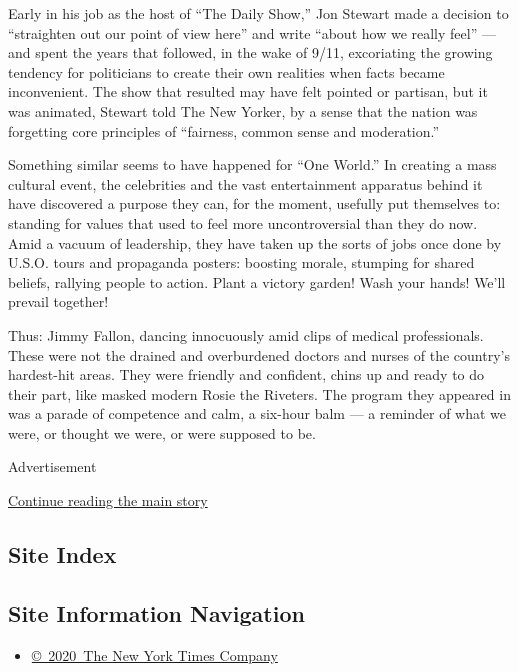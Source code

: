 Early in his job as the host of ``The Daily Show,'' Jon Stewart made a
decision to ``straighten out our point of view here'' and write ``about
how we really feel'' --- and spent the years that followed, in the wake
of 9/11, excoriating the growing tendency for politicians to create
their own realities when facts became inconvenient. The show that
resulted may have felt pointed or partisan, but it was animated, Stewart
told The New Yorker, by a sense that the nation was forgetting core
principles of ``fairness, common sense and moderation.''

Something similar seems to have happened for ``One World.'' In creating
a mass cultural event, the celebrities and the vast entertainment
apparatus behind it have discovered a purpose they can, for the moment,
usefully put themselves to: standing for values that used to feel more
uncontroversial than they do now. Amid a vacuum of leadership, they have
taken up the sorts of jobs once done by U.S.O. tours and propaganda
posters: boosting morale, stumping for shared beliefs, rallying people
to action. Plant a victory garden! Wash your hands! We'll prevail
together!

Thus: Jimmy Fallon, dancing innocuously amid clips of medical
professionals. These were not the drained and overburdened doctors and
nurses of the country's hardest-hit areas. They were friendly and
confident, chins up and ready to do their part, like masked modern Rosie
the Riveters. The program they appeared in was a parade of competence
and calm, a six-hour balm --- a reminder of what we were, or thought we
were, or were supposed to be.

Advertisement

\protect\hyperlink{after-bottom}{Continue reading the main story}

\hypertarget{site-index}{%
\subsection{Site Index}\label{site-index}}

\hypertarget{site-information-navigation}{%
\subsection{Site Information
Navigation}\label{site-information-navigation}}

\begin{itemize}
\tightlist
\item
  \href{https://help.nytimes3xbfgragh.onion/hc/en-us/articles/115014792127-Copyright-notice}{©~2020~The
  New York Times Company}
\end{itemize}

